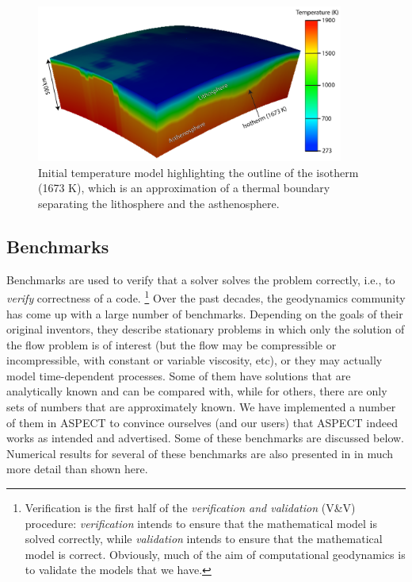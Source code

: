 \documentclass{article}
\newcommand{\aspect}{\textsc{ASPECT}}
\begin{document}
 \begin{figure}
    \centering
    \includegraphics[width=0.9\textwidth]{cookbooks/adiabatic_boundary/initial_temperature_model.pdf}
    \caption{Initial temperature model highlighting the outline of the isotherm (1673 K), which is an approximation of a thermal boundary separating the lithosphere and the asthenosphere.}
    \label{fig:adiabatic-boundary}
\end{figure}

\subsection{Benchmarks}
\label{sec:cookbooks-benchmarks}

Benchmarks are used to verify that a solver solves the problem correctly,
i.e., to \textit{verify} correctness of a code.%
\footnote{Verification is the first half of the \textit{verification and
    validation} (V\&V) procedure: \textit{verification} intends to ensure that the
  mathematical model is solved correctly, while \textit{validation} intends to
  ensure that the mathematical model is correct. Obviously, much of the aim of
  computational geodynamics is to validate the models that we have.}
Over the past decades, the geodynamics community has come up with a large
number of benchmarks. Depending on the goals of their original inventors, they
describe stationary problems in which only the solution of the flow problem is
of interest (but the flow may be compressible or incompressible, with constant
or variable viscosity, etc), or they may actually model time-dependent
processes. Some of them have solutions that are analytically known and can be
compared with, while for others, there are only sets of numbers that are
approximately known. We have implemented a number of them in \aspect{} to
convince ourselves (and our users) that \aspect{} indeed works as intended and
advertised. Some of these benchmarks are discussed below. Numerical results
for several of these benchmarks are also presented in \cite{KHB12} in much more
detail than shown here.
\end{document}
